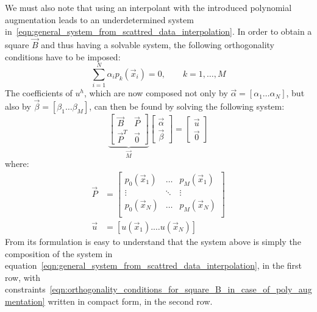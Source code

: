 We must also note that using an interpolant with the introduced polynomial augmentation leads to an underdetermined system in~\eqref{eqn:general_system_from_scattred_data_interpolation}. In order to obtain a square $\vec{B}$ and thus having a solvable system, the following orthogonality conditions have to be imposed:
\begin{equation}
	\label{eqn:orthogonality_conditions_for_square_B_in_case_of_poly_augmentation}
	\sum_{i=1}^{N} \alpha_i p_k(\vec{x}_i) = 0, \qquad k=1, \dots, M
\end{equation}
The coefficients of $u^h$, which are now composed not only by $\vec{\alpha} = [\alpha_1 \dots \alpha_N]$, but also by $\vec{\beta} = [\beta_1 \dots \beta_M]$, can then be found by solving the following system:
\begin{equation}
\label{eqn:general_system_from_scattred_data_interpolation_poly_augmentation}
\underbrace{
\begin{bmatrix}
	\vec{B}  & \vec{P}  \\
	\vec{P}^T  & \vec{0}
\end{bmatrix}
}_{\vec{M}}
\begin{bmatrix}
	\vec{\alpha}  \\
	\vec{\beta}
\end{bmatrix}
=
\begin{bmatrix}
	\vec{u}  \\
	\vec{0}
\end{bmatrix}
\end{equation}
where:
\begin{equation}
	\begin{aligned}
		\vec{P} & =
		\begin{bmatrix}
			p_0(\vec{x}_1)  & \dots     & p_M(\vec{x}_1)  \\
			\vdots					 & \ddots  & \vdots						\\
			p_0(\vec{x}_N)  & \dots     & p_M(\vec{x}_N)  \\
		\end{bmatrix}  \\[2ex]
		\vec{u} & = [u(\vec{x}_1). \dots u(\vec{x}_N)]
	\end{aligned} 
\end{equation}
From its formulation is easy to understand that the system above is simply the composition of the system in equation~\eqref{eqn:general_system_from_scattred_data_interpolation}, in the first row, with constraints~\eqref{eqn:orthogonality_conditions_for_square_B_in_case_of_poly_augmentation} written in compact form, in the second row.

